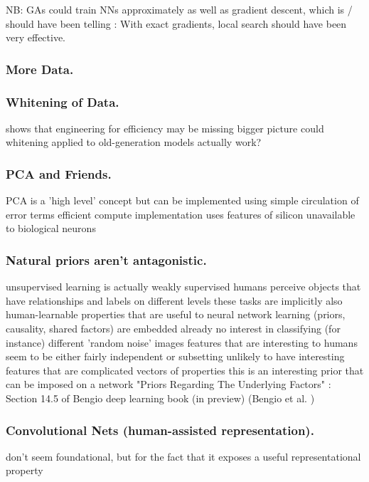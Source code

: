 \documentclass[citeauthoryear]{llncs}
\begin{document}
NB: GAs could train NNs approximately as well as gradient descent, which 
is / should have been telling : With exact gradients, local search should have 
been very effective.


\subsubsection*{More Data.}

\subsubsection*{Whitening of Data.}
    shows that engineering for efficiency may be missing bigger picture
    could whitening applied to old-generation models actually work?


\subsubsection*{PCA and Friends.}
PCA is a 'high level' concept
  but can be implemented using simple circulation of error terms
  efficient compute implementation uses features of silicon unavailable to biological neurons

\subsubsection*{Natural priors aren't antagonistic.}
unsupervised learning is actually weakly supervised 
  humans perceive objects that have relationships and labels on different levels
    these tasks are implicitly also human-learnable
    properties that are useful to neural network learning (priors, causality, shared factors) are embedded already
  no interest in classifying (for instance) different 'random noise' images
  features that are interesting to humans seem to be either fairly independent or subsetting
    unlikely to have interesting features that are complicated vectors of properties
    this is an interesting prior that can be imposed on a network
      "Priors Regarding The Underlying Factors" : Section 14.5 of Bengio deep learning book (in preview) 
        (Bengio et al. \cite{Bengio-et-al-2014-Book}) 

\subsubsection*{Convolutional Nets (human-assisted representation).}
don't seem foundational, but for the fact that it exposes a useful representational property
\end{document}
